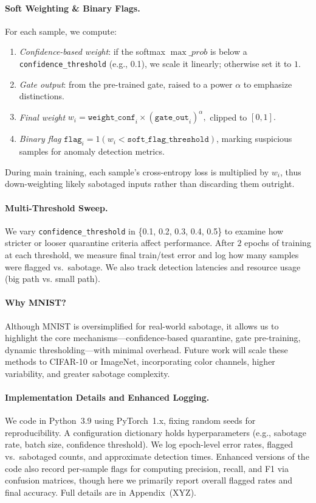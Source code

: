 \documentclass[12pt]{article}
\begin{document}
\paragraph{Soft Weighting \& Binary Flags.}
For each sample, we compute:
\begin{enumerate}
    \item \emph{Confidence-based weight}: if the softmax $\max\_prob$ is below a
          \texttt{confidence\_threshold} (e.g., 0.1), we scale it linearly; otherwise
          set it to $1$.
    \item \emph{Gate output}: from the pre-trained gate, raised to a power
          $\alpha$ to emphasize distinctions.
    \item \emph{Final weight} $w_i = \texttt{weight\_conf}_i \times
            (\texttt{gate\_out}_i)^\alpha,$ clipped to $[0,1].$
    \item \emph{Binary flag} $\texttt{flag}_i = 1(w_i < \texttt{soft\_flag\_threshold})$,
          marking suspicious samples for anomaly detection metrics.
\end{enumerate}
During main training, each sample’s cross-entropy loss is multiplied by $w_i$,
thus down-weighting likely sabotaged inputs rather than discarding them outright.

\paragraph{Multi-Threshold Sweep.}
We vary \texttt{confidence\_threshold} in \{0.1, 0.2, 0.3, 0.4, 0.5\} to examine
how stricter or looser quarantine criteria affect performance. After $2$ epochs
of training at each threshold, we measure final train/test error and log how
many samples were flagged vs.\ sabotage. We also track detection latencies and
resource usage (big path vs. small path).

\paragraph{Why MNIST?}
\label{subsec:why_mnist}
Although MNIST is oversimplified for real-world sabotage, it allows us to highlight
the core mechanisms---confidence-based quarantine, gate pre-training, dynamic
thresholding---with minimal overhead. Future work will scale these methods to
CIFAR-10 or ImageNet, incorporating color channels, higher variability, and
greater sabotage complexity.

\paragraph{Implementation Details and Enhanced Logging.}
We code in Python~3.9 using PyTorch~1.x, fixing random seeds for reproducibility.
A configuration dictionary holds hyperparameters (e.g., sabotage rate, batch size,
confidence threshold). We log epoch-level error rates, flagged vs.\ sabotaged
counts, and approximate detection times. Enhanced versions of the code also record
per-sample flags for computing precision, recall, and F1 via confusion matrices,
though here we primarily report overall flagged rates and final accuracy. Full
details are in Appendix~(XYZ). 
\end{document}
